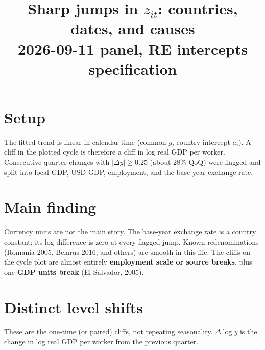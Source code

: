\documentclass[11pt]{article}
\title{Sharp jumps in $z_{it}$: countries, dates, and causes\\[0.4em]
\large 2026-09-11 panel, RE intercepts specification}
\author{}
\date{}
\begin{document}
\maketitle

\section{Setup}

The fitted trend is linear in calendar time (common $g$, country intercept $a_i$).
A cliff in the plotted cycle is therefore a cliff in log real GDP per worker.
Consecutive-quarter changes with $|\Delta y|\ge 0.25$ (about 28\% QoQ) were
flagged and split into local GDP, USD GDP, employment, and the base-year
exchange rate.

\section{Main finding}

Currency units are not the main story.
The base-year exchange rate is a country constant; its log-difference
is zero at every flagged jump.
Known redenominations (Romania 2005, Belarus 2016, and others) are smooth in
this file.
The cliffs on the cycle plot are almost entirely \textbf{employment scale or
source breaks}, plus one \textbf{GDP units break} (El Salvador, 2005).

\section{Distinct level shifts}

These are the one-time (or paired) cliffs, not repeating seasonality.
$\Delta\log y$ is the change in log real GDP per worker from the previous
quarter.
\end{document}

